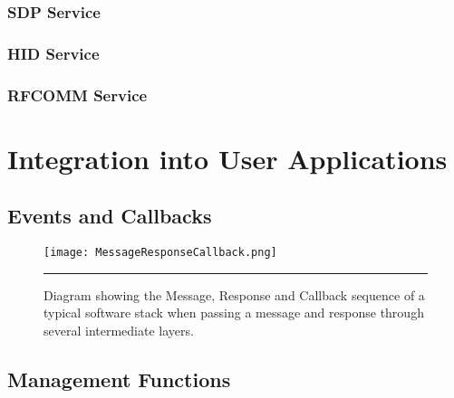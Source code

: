 
\FloatBarrier
\subsubsection{SDP Service}


\FloatBarrier
\subsubsection{HID Service}


\FloatBarrier
\subsubsection{RFCOMM Service}


\section{Integration into User Applications}


\FloatBarrier
\subsection{Events and Callbacks}

\begin{figure}[tbph]
	\vspace{1em}
	\centering
		\texttt{[image: MessageResponseCallback.png]}
	\rule{35em}{0.5pt}
	\caption[Diagram of the Message, Response and Callback sequence]{Diagram showing the Message, Response and Callback sequence of a typical software stack when passing a message and response through several intermediate layers.}
	\label{fig:messageresponsecallback}
\end{figure}


\FloatBarrier
\subsection{Management Functions}

